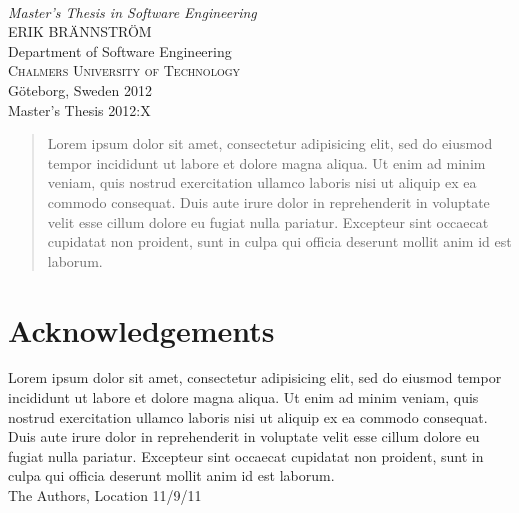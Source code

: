 \begin{titlepage}

\mbox{}
\vfill
\addtolength{\voffset}{2cm}
\begin{flushleft}
	{ \\[0.5cm]
	\emph{\Large Master's Thesis in Software Engineering} \\[.8cm]

	{\huge ERIK BRÄNNSTRÖM}\\[.8cm]

	{\Large Department of Software Engineering \\
	\textsc{Chalmers University of Technology} \\
	Göteborg, Sweden 2012 \\
	Master's Thesis 2012:X\\
	}
	}
\end{flushleft}

\end{titlepage}
\ClearShipoutPicture

\pagestyle{empty}
\newpage
\clearpage
\mbox{}
\newpage
\clearpage
\thispagestyle{empty}

\begin{abstract}
Lorem ipsum dolor sit amet, consectetur adipisicing elit, sed do eiusmod tempor incididunt ut labore et dolore magna aliqua. Ut enim ad minim veniam, quis nostrud exercitation ullamco laboris nisi ut aliquip ex ea commodo consequat. Duis aute irure dolor in reprehenderit in voluptate velit esse cillum dolore eu fugiat nulla pariatur. Excepteur sint occaecat cupidatat non proident, sunt in culpa qui officia deserunt mollit anim id est laborum.
\end{abstract}

\newpage
\clearpage
\mbox{}
\newpage
\clearpage
\thispagestyle{empty}
\section*{Acknowledgements}
Lorem ipsum dolor sit amet, consectetur adipisicing elit, sed do eiusmod tempor incididunt ut labore et dolore magna aliqua. Ut enim ad minim veniam, quis nostrud exercitation ullamco laboris nisi ut aliquip ex ea commodo consequat. Duis aute irure dolor in reprehenderit in voluptate velit esse cillum dolore eu fugiat nulla pariatur. Excepteur sint occaecat cupidatat non proident, sunt in culpa qui officia deserunt mollit anim id est laborum. \\[1cm]

\hfill The Authors, Location 11/9/11
\newpage
\clearpage
\mbox{}